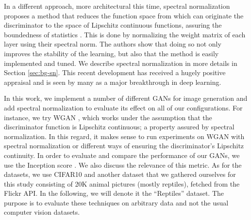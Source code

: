 In a different approach, more architectural this time, spectral normalization proposes a method that reduces the function space from which can originate the discriminator to the space of Lipschitz continuous functions, assuring the boundedness of statistics . This is done by normalizing the weight matrix of each layer using their spectral norm. The authors show that doing so not only improves the stability of the learning, but also that the method is easily implemented and tuned. We describe spectral normalization in more details in Section \ref{sec:bg-sn}. This recent development has received a hugely positive appraisal and is seen by many as a major breakthrough in deep learning.

In this work, we implement a number of different GANs for image generation and add spectral normalization \cite{miyato2018spectral} to evaluate its effect on all of our configurations. For instance, we try WGAN \cite{arjovsky2017wasserstein}, which works under the assumption that the discriminator function is Lipschitz continuous; a property assured by spectral normalization. In this regard, it makes sense to run experiments on WGAN with spectral normalization or different ways of ensuring the discriminator's Lipschitz continuity. In order to evaluate and compare the performance of our GANs, we use the Inception score \cite{salimans2016improved}. We also discuss the relevance of this metric. As for the datasets, we use CIFAR10 \cite{cifar100} and another dataset that we gathered ourselves for this study consisting of 20K animal pictures (mostly reptiles), fetched from the Flickr API. In the following, we will denote it the ``Reptiles'' dataset. The purpose is to evaluate these techniques on arbitrary data and not the usual computer vision datasets. 

